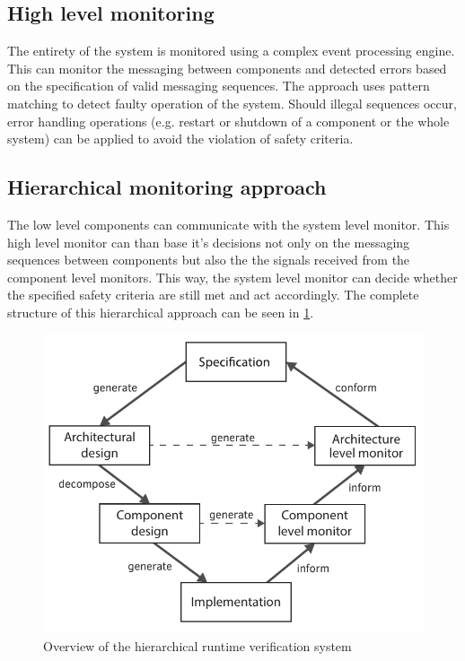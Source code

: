 \subsection{High level monitoring}
The entirety of the system is monitored using a complex event processing engine. This can monitor the messaging between components and detected errors based on the specification of valid messaging sequences. The approach uses pattern matching to detect faulty operation of the system. Should illegal sequences occur, error handling operations (e.g. restart or shutdown of a component or the whole system) can be applied to avoid the violation of safety criteria.

\subsection{Hierarchical monitoring approach}
The low level components can communicate with the system level monitor. This high level monitor can than base it's decisions not only on the messaging sequences between components but also the the signals received from the component level monitors. This way, the system level monitor can decide whether the specified safety criteria are still met and act accordingly. The complete structure of this hierarchical approach can be seen in \cref{fig:intro:rvmodel}.

\begin{figure}[h]
	\centering
	\includegraphics[width=0.55\linewidth]{include/figures/chapter_1/rv_vmodel}
	\caption{Overview of the hierarchical runtime verification system}
	\label{fig:intro:rvmodel}
\end{figure}
